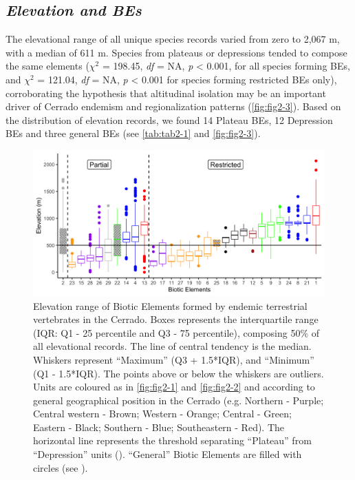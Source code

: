 \documentclass[12pt,openright,oneside,a4paper,english]{abntex2}
\begin{document}
\subsection{\textit{Elevation and BEs}}\label{sub:top}

The elevational range of all unique species records varied from zero to 2,067 m, with a median of 611 m. Species from plateaus or depressions tended to compose the same elements ($\chi^2$  = 198.45, \textit{df} = NA, \textit{p} <  0.001, for all species forming BEs, and $\chi^2$ = 121.04, \textit{df} = NA, \textit{p} <  0.001 for species forming restricted BEs only), corroborating the hypothesis that altitudinal isolation may be an important driver of Cerrado endemism and regionalization patterns (\autoref{fig:fig2-3}). Based on the distribution of elevation records, we found 14 Plateau BEs, 12 Depression BEs and three general BEs (see \autoref{tab:tab2-1} and \autoref{fig:fig2-3}).

\begin{figure}[htb]
	\centering
	\includegraphics[width=160mm]{Fig c2-3}
	\caption[Biotic Elements (BEs) elevational range]{\footnotesize Elevation range of Biotic Elements formed by endemic terrestrial vertebrates in the Cerrado. Boxes represents the interquartile range (IQR: Q1 - 25 percentile and Q3 - 75 percentile), composing 50\% of all elevational records. The line of central tendency is the median. Whiskers represent “Maximum” (Q3 + 1.5*IQR), and “Minimum” (Q1 - 1.5*IQR). The points above or below the whiskers are outliers. Units are coloured as in \autoref{fig:fig2-1} and \autoref{fig:fig2-2} and according to general geographical position in the Cerrado (e.g. Northern - Purple; Central western - Brown; Western - Orange; Central - Green; Eastern - Black; Southern - Blue; Southeastern - Red). The horizontal line represents the threshold separating “Plateau” from “Depression” units (\citealp[see][]{Silva1997}). “General” Biotic Elements are filled with circles (see ).}
	\label{fig:fig2-3}
\end{figure}
\end{document}
